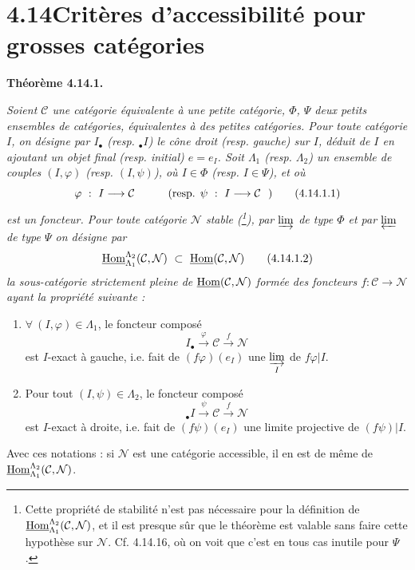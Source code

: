 \section*{4.14\quad Critères d'accessibilité pour grosses catégories}

\noindent\textbf{Théorème 4.14.1.} {\itshape Soient $\mathcal{C}$ une catégorie équivalente à une petite catégorie, $\Phi$, $\Psi$ deux petits ensembles de catégories, équivalentes à des petites catégories. Pour toute catégorie $I$, on désigne par $I_{\bullet}$ (resp. ${}_{\bullet}I$) le cône droit (resp. gauche) sur $I$, déduit de $I$ en ajoutant un objet final (resp. initial) $e=e_I$. Soit $\Lambda_1$ (resp. $\Lambda_2$) un ensemble de couples $(I,\varphi)$ (resp. $(I,\psi)$), où $I\in\Phi$ (resp. $I\in\Psi$), et où
\[
\varphi\ :\ I \longrightarrow \mathcal{C} \qquad\quad \text{(resp. }\psi\ :\ I \longrightarrow \mathcal{C}\ \ \text{)} \tag*{\textup{(4.14.1.1)}}
\]
est un foncteur. Pour toute catégorie $\mathcal{N}$ stable (\footnote[163]{Cette propriété de stabilité n'est pas nécessaire pour la définition de $\underline{\mathrm{Hom}}^{\Lambda_2}_{\Lambda_1}(\mathcal{C},\mathcal{N})$, et il est presque sûr que le théorème est valable sans faire cette hypothèse sur $\mathcal{N}$. Cf. 4.14.16, où on voit que c'est en tous cas inutile pour $\Psi$.}), par $\varinjlim$ de type $\Phi$ et par $\varprojlim$ de type $\Psi$ on désigne par
\[
\uHom^{\Lambda_2}_{\Lambda_1}(\mathcal{C},\mathcal{N})\ \subset\ \uHom(\mathcal{C},\mathcal{N}) \tag*{\textup{(4.14.1.2)}}
\]
la sous-catégorie strictement pleine de $\underline{\mathrm{Hom}}(\mathcal{C},\mathcal{N})$ formée des foncteurs $f:\mathcal{C}\longrightarrow\mathcal{N}$ ayant la propriété suivante :
\begin{enumerate}[leftmargin=2.5em]
\item[\textit{a)}] $\forall\ (I,\varphi)\in\Lambda_1$, le foncteur composé
\[
I_{\bullet} \xrightarrow{\ \varphi\ } \mathcal{C} \xrightarrow{\ f\ } \mathcal{N}
\]
est $I$-exact à gauche, i.e. fait de $(f\varphi)(e_I)$ une $\varinjlim\limits_{I}$ de $f\varphi|I$.
\item[\textit{b)}] Pour tout $(I,\psi)\in\Lambda_2$, le foncteur composé
\[
{}_{\bullet}I \xrightarrow{\ \psi\ } \mathcal{C} \xrightarrow{\ f\ } \mathcal{N}
\]
est $I$-exact à droite, i.e. fait de $(f\psi)(e_I)$ une limite projective de $(f\psi)|I$.
\end{enumerate}
\noindent Avec ces notations : si $\mathcal{N}$ est une catégorie accessible, il en est de même de $\underline{\mathrm{Hom}}^{\Lambda_2}_{\Lambda_1}(\mathcal{C},\mathcal{N})$.}

